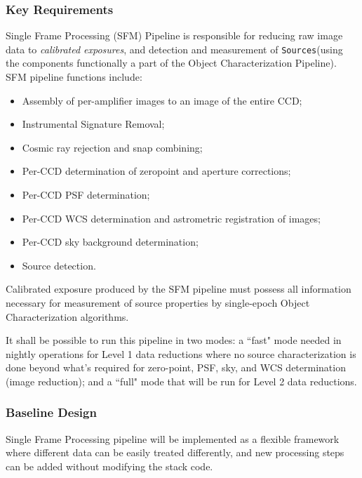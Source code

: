 \documentclass[12pt]{article}
\newcommand{\code}[1]{\texttt{#1}}
\newcommand{\Sources}{\code{Sources}\xspace}
\begin{document}
\subsubsection{Key Requirements}

Single Frame Processing (SFM) Pipeline is responsible for reducing raw image data to \emph{calibrated exposures}, and detection and measurement of \Sources (using the components functionally a part of the Object Characterization Pipeline).
\\

SFM pipeline functions include:
%
\begin{itemize}
    \item Assembly of per-amplifier images to an image of the entire CCD;
    \item Instrumental Signature Removal;
    \item Cosmic ray rejection and snap combining;
    \item Per-CCD determination of zeropoint and aperture corrections;
    \item Per-CCD PSF determination;
    \item Per-CCD WCS determination and astrometric registration of images;
    \item Per-CCD sky background determination;
    \item Source detection.
\end{itemize}

Calibrated exposure produced by the SFM pipeline must possess all information necessary for measurement of source properties by single-epoch Object Characterization algorithms.

It shall be possible to run this pipeline in two modes: a ``fast" mode needed in nightly operations for Level 1 data reductions where no source characterization is done beyond what's required for zero-point, PSF, sky, and WCS determination (image reduction); and a ``full" mode that will be run for Level 2 data reductions.

\subsubsection{Baseline Design}

Single Frame Processing pipeline will be implemented as a flexible framework where different data can be easily treated differently, and new processing steps can be added without modifying the stack code.
\\
\end{document}
